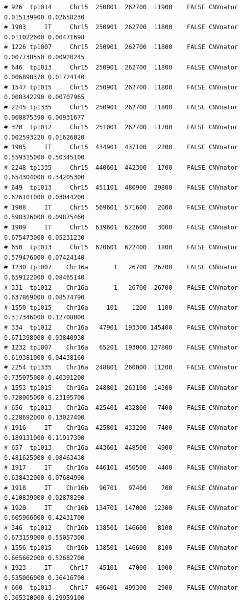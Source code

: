 \documentclass{article}\usepackage[]{graphicx}\usepackage[]{color}
\makeatletter
\newenvironment{kframe}{%
 \def\at@end@of@kframe{}%
 \ifinner\ifhmode%
  \def\at@end@of@kframe{\end{minipage}}%
  \begin{minipage}{\columnwidth}%
 \fi\fi%
 \def\FrameCommand##1{\hskip\@totalleftmargin \hskip-\fboxsep
 \colorbox{shadecolor}{##1}\hskip-\fboxsep
     \hskip-\linewidth \hskip-\@totalleftmargin \hskip\columnwidth}%
 \MakeFramed {\advance\hsize-\width
   \@totalleftmargin\z@ \linewidth\hsize
   \@setminipage}}%
 {\par\unskip\endMakeFramed%
 \at@end@of@kframe}
\newenvironment{knitrout}{}{} %
\makeatother
\begin{document}
\begin{knitrout}
\begin{kframe}
\begin{verbatim}
# 926  tp1014     Chr15  250801  262700  11900    FALSE CNVnator 0.015139900 0.02658230
# 1903     IT     Chr15  250901  262700  11800    FALSE CNVnator 0.011022600 0.00471698
# 1226 tp1007     Chr15  250901  262700  11800    FALSE CNVnator 0.007738550 0.00920245
# 646  tp1013     Chr15  250901  262700  11800    FALSE CNVnator 0.006898370 0.01724140
# 1547 tp1015     Chr15  250901  262700  11800    FALSE CNVnator 0.008342290 0.00707965
# 2245 tp1335     Chr15  250901  262700  11800    FALSE CNVnator 0.008875390 0.00931677
# 320  tp1012     Chr15  251001  262700  11700    FALSE CNVnator 0.002593220 0.01626020
# 1905     IT     Chr15  434901  437100   2200    FALSE CNVnator 0.559315000 0.50345100
# 2248 tp1335     Chr15  440601  442300   1700    FALSE CNVnator 0.654304000 0.34205300
# 649  tp1013     Chr15  451101  480900  29800    FALSE CNVnator 0.626101000 0.03044200
# 1908     IT     Chr15  569601  571600   2000    FALSE CNVnator 0.598326000 0.09875460
# 1909     IT     Chr15  619601  622600   3000    FALSE CNVnator 0.675473000 0.05231230
# 650  tp1013     Chr15  620601  622400   1800    FALSE CNVnator 0.579476000 0.07424140
# 1230 tp1007    Chr16a       1   26700  26700    FALSE CNVnator 0.659122000 0.08465140
# 331  tp1012    Chr16a       1   26700  26700    FALSE CNVnator 0.637869000 0.08574790
# 1550 tp1015    Chr16a     101    1200   1100    FALSE CNVnator 0.317346000 0.12708000
# 334  tp1012    Chr16a   47901  193300 145400    FALSE CNVnator 0.671398000 0.03840930
# 1232 tp1007    Chr16a   65201  193000 127800    FALSE CNVnator 0.619381000 0.04438160
# 2254 tp1335    Chr16a  248801  260000  11200    FALSE CNVnator 0.735075000 0.40391200
# 1553 tp1015    Chr16a  248801  263100  14300    FALSE CNVnator 0.728005000 0.23195700
# 656  tp1013    Chr16a  425401  432800   7400    FALSE CNVnator 0.228692000 0.13027400
# 1916     IT    Chr16a  425801  433200   7400    FALSE CNVnator 0.189131000 0.11917300
# 657  tp1013    Chr16a  443601  448500   4900    FALSE CNVnator 0.481625000 0.08463430
# 1917     IT    Chr16a  446101  450500   4400    FALSE CNVnator 0.638432000 0.07684990
# 1918     IT    Chr16b   96701   97400    700    FALSE CNVnator 0.410839000 0.02878290
# 1920     IT    Chr16b  134701  147000  12300    FALSE CNVnator 0.605966000 0.42431700
# 346  tp1012    Chr16b  138501  146600   8100    FALSE CNVnator 0.673159000 0.55057300
# 1556 tp1015    Chr16b  138501  146600   8100    FALSE CNVnator 0.665662000 0.52682700
# 1923     IT     Chr17   45101   47000   1900    FALSE CNVnator 0.535006000 0.36416700
# 660  tp1013     Chr17  496401  499300   2900    FALSE CNVnator 0.365310000 0.29959100

\end{verbatim}
\end{kframe}
\end{knitrout}
\end{document}
